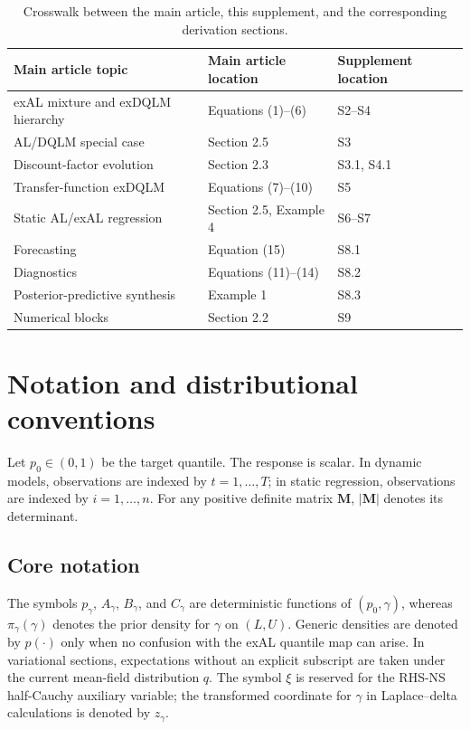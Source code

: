 \documentclass[nojss,noheadings]{jss}
\newcommand{\mat}[1]{\mathbf{#1}}
\newcommand{\pigamma}{\pi_\gamma}
\newcommand{\TableStyle}{\footnotesize\setlength{\tabcolsep}{4pt}\renewcommand{\arraystretch}{1.08}}
\begin{document}
\begin{table}[!htb]
\centering
\begingroup
\TableStyle
\begin{tabularx}{\textwidth}{@{}>{\raggedright\arraybackslash}p{}
>{\raggedright\arraybackslash}p{}
>{\raggedright\arraybackslash}X@{}}
\toprule
Main article topic & Main article location & Supplement location \\
\midrule
exAL mixture and exDQLM hierarchy & Equations (1)--(6) & S2--S4 \\
AL/DQLM special case & Section 2.5 & S3 \\
Discount-factor evolution & Section 2.3 & S3.1, S4.1 \\
Transfer-function exDQLM & Equations (7)--(10) & S5 \\
Static AL/exAL regression & Section 2.5, Example 4 & S6--S7 \\
Forecasting & Equation (15) & S8.1 \\
Diagnostics & Equations (11)--(14) & S8.2 \\
Posterior-predictive synthesis & Example 1 & S8.3 \\
Numerical blocks & Section 2.2 & S9 \\
\bottomrule
\end{tabularx}
\endgroup
\caption{Crosswalk between the main article, this supplement, and the
corresponding derivation sections.}
\label{tab:supp_article_crosswalk}
\end{table}

\section{Notation and distributional conventions}

Let $p_0\in(0,1)$ be the target quantile. The response is scalar. In dynamic
models, observations are indexed by $t=1,\ldots,T$; in static regression,
observations are indexed by $i=1,\ldots,n$. For any positive definite matrix
$\mat{M}$, $|\mat{M}|$ denotes its determinant.

\subsection{Core notation}

The symbols $p_\gamma$, $A_\gamma$, $B_\gamma$, and $C_\gamma$ are deterministic
functions of $(p_0,\gamma)$, whereas $\pigamma(\gamma)$ denotes the prior
density for $\gamma$ on $(L,U)$. Generic densities are denoted by $p(\cdot)$
only when no confusion with the exAL quantile map can arise. In variational
sections, expectations without an explicit subscript are taken under the
current mean-field distribution $q$. The symbol $\xi$ is reserved for the
RHS-NS half-Cauchy auxiliary variable; the transformed coordinate for $\gamma$
in Laplace--delta calculations is denoted by $z_\gamma$.
\end{document}
